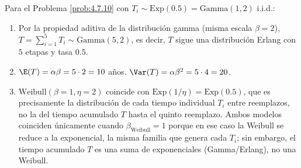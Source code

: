 \begin{solucion}
	\label{sol:4.7.10}
	Para el Problema \ref{prob:4.7.10} con $T_i \sim \text{Exp}(0.5) = \text{Gamma}(1,2)$ i.i.d.:
	\begin{enumerate}
		\item Por la propiedad aditiva de la distribución gamma (misma escala $\beta=2$), $T=\sum_{i=1}^{5}T_i \sim \text{Gamma}(5,2)$, es decir, $T$ sigue una distribución Erlang con $5$ etapas y tasa $0.5$.
		\item $\E(T) = \alpha\beta = 5\cdot 2 = 10$ años. $\Var(T) = \alpha\beta^{2} = 5\cdot 4 = 20$.
		\item $\text{Weibull}(\beta=1,\eta=2)$ coincide con $\text{Exp}(1/\eta) = \text{Exp}(0.5)$, que es precisamente la distribución de cada tiempo individual $T_i$ entre reemplazos, no la del tiempo acumulado $T$ hasta el quinto reemplazo. Ambos modelos coinciden únicamente cuando $\beta_{\text{Weibull}}=1$ porque en ese caso la Weibull se reduce a la exponencial, la misma familia que genera cada $T_i$; sin embargo, el tiempo acumulado $T$ es una suma de exponenciales (Gamma/Erlang), no una Weibull. \quad \qedhere
	\end{enumerate}
\end{solucion}
